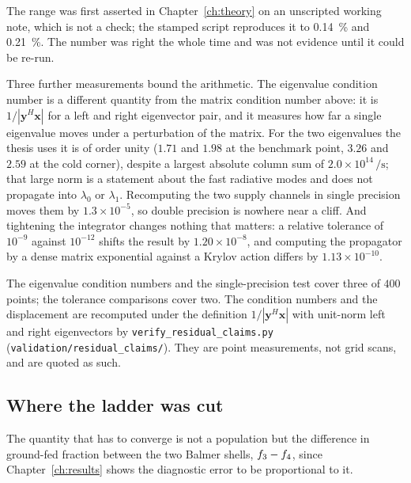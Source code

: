 The range was first asserted in Chapter~\ref{ch:theory} on an unscripted
working note, which is not a check; the stamped script reproduces it to
\SI{0.14}{\percent} and \SI{0.21}{\percent}. The number was right the whole
time and was not evidence until it could be re-run.

Three further measurements bound the arithmetic. The eigenvalue condition
number is a different quantity from the matrix condition number above: it is
$1/|\bm{y}^H\bm{x}|$ for a left and right eigenvector pair, and it measures how
far a single eigenvalue moves under a perturbation of the matrix. For the two
eigenvalues the thesis uses it is of order unity
($1.71$ and $1.98$ at the benchmark point, $3.26$ and $2.59$ at the cold
corner), despite a largest absolute column sum of
$2.0\times10^{14}\,\si{\per\second}$; that large norm is a
statement about the fast radiative modes and does not propagate into
$\lambda_0$ or $\lambda_1$. Recomputing the two supply channels in single
precision moves them by $1.3\times10^{-5}$, so double precision is nowhere near
a cliff. And tightening the integrator changes nothing that matters: a relative
tolerance of $10^{-9}$ against $10^{-12}$ shifts the result by
$1.20\times10^{-8}$, and computing the propagator by a dense matrix exponential
against a Krylov action differs by $1.13\times10^{-10}$.

The eigenvalue condition numbers and the single-precision test cover three of
$400$ points; the tolerance comparisons cover two. The condition numbers and the
displacement are recomputed under the definition $1/|\bm{y}^H\bm{x}|$ with
unit-norm left and right eigenvectors by \texttt{verify\_residual\_claims.py}
(\texttt{validation/residual\_claims/}). They are point measurements, not grid
scans, and are quoted as such.

\subsection{Where the ladder was cut}
\label{sec:convergence}

The quantity that has to converge is not a population but the difference in
ground-fed fraction between the two Balmer shells, $f_{3}-f_{4}$, since
Chapter~\ref{ch:results} shows the diagnostic error to be proportional to it.

